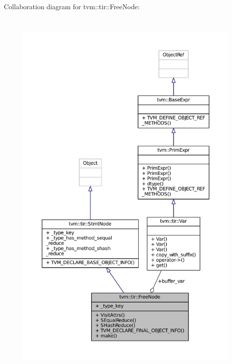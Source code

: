 Collaboration diagram for tvm\+:\+:tir\+:\+:Free\+Node\+:
\nopagebreak
\begin{figure}[H]
\begin{center}
\leavevmode
\includegraphics[height=550pt]{classtvm_1_1tir_1_1FreeNode__coll__graph}
\end{center}
\end{figure}
